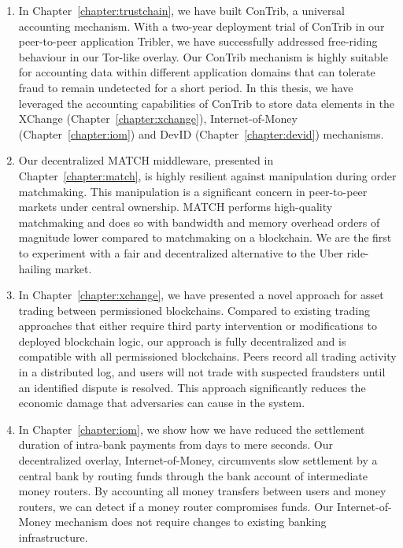 \begin{enumerate}
	\item In Chapter~\ref{chapter:trustchain}, we have built ConTrib, a universal accounting mechanism.
	With a two-year deployment trial of ConTrib in our peer-to-peer application Tribler, we have successfully addressed free-riding behaviour in our Tor-like overlay.
	Our ConTrib mechanism is highly suitable for accounting data within different application domains that can tolerate fraud to remain undetected for a short period.
	In this thesis, we have leveraged the accounting capabilities of ConTrib to store data elements in the XChange (Chapter~\ref{chapter:xchange}), Internet-of-Money (Chapter~\ref{chapter:iom}) and DevID (Chapter~\ref{chapter:devid}) mechanisms.
	
	\item Our decentralized MATCH middleware, presented in Chapter~\ref{chapter:match}, is highly resilient against manipulation during order matchmaking.
	This manipulation is a significant concern in peer-to-peer markets under central ownership.
	MATCH performs high-quality matchmaking and does so with bandwidth and memory overhead orders of magnitude lower compared to matchmaking on a blockchain.
	We are the first to experiment with a fair and decentralized alternative to the Uber ride-hailing market.
	
	\item In Chapter~\ref{chapter:xchange}, we have presented a novel approach for asset trading between permissioned blockchains.
	Compared to existing trading approaches that either require third party intervention or modifications to deployed blockchain logic, our approach is fully decentralized and is compatible with all permissioned blockchains.
	Peers record all trading activity in a distributed log, and users will not trade with suspected fraudsters until an identified dispute is resolved.
	This approach significantly reduces the economic damage that adversaries can cause in the system.
	
	\item In Chapter~\ref{chapter:iom}, we show how we have reduced the settlement duration of intra-bank payments from days to mere seconds.
	Our decentralized overlay, Internet-of-Money, circumvents slow settlement by a central bank by routing funds through the bank account of intermediate money routers.
	By accounting all money transfers between users and money routers, we can detect if a money router compromises funds.
	Our Internet-of-Money mechanism does not require changes to existing banking infrastructure.
	

\end{enumerate}
